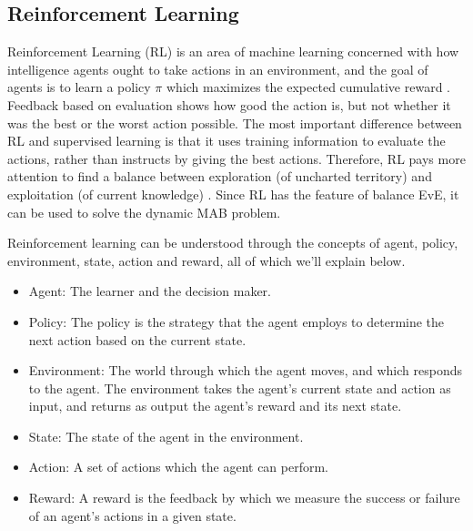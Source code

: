 \documentclass[journal]{IEEEtran}
\begin{document}
\subsection{Reinforcement Learning}
Reinforcement Learning (RL) \cite{sutton2018reinforcement} is an area of machine learning concerned with how intelligence agents ought to take actions in an environment, and the goal of agents is to learn a policy $\pi$ which maximizes the expected cumulative reward \cite{van2012reinforcement}.
Feedback based on evaluation shows how good the action is, but not whether it was the best or the worst action possible.
The most important difference between RL and supervised learning is that it uses training information to evaluate the actions, rather than instructs by giving the best actions.
Therefore, RL pays more attention to find a balance between exploration (of uncharted territory) and exploitation (of current knowledge) \cite{kaelbling1996reinforcement}.
Since RL has the feature of balance EvE, it can be used to solve the dynamic MAB problem.

Reinforcement learning can be understood through the concepts of agent, policy, environment, state, action and reward, all of which we’ll explain below.
% 
\begin{itemize}
  \item Agent: The learner and the decision maker.
  \item Policy: The policy is the strategy that the agent employs to determine the next action based on the current state.
  \item Environment: The world through which the agent moves, and which responds to the agent. The environment takes the agent’s current state and action as input, and returns as output the agent’s reward and its next state.
  \item State: The state of the agent in the environment.
  \item Action: A set of actions which the agent can perform.
  \item Reward: A reward is the feedback by which we measure the success or failure of an agent’s actions in a given state.
\end{itemize}
\end{document}
